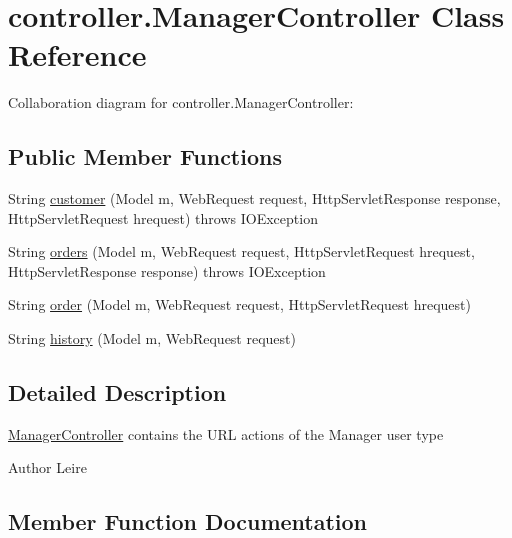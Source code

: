 \hypertarget{classcontroller_1_1_manager_controller}{}\section{controller.\+Manager\+Controller Class Reference}
\label{classcontroller_1_1_manager_controller}


Collaboration diagram for controller.\+Manager\+Controller\+:
\subsection*{Public Member Functions}
\begin{DoxyCompactItemize}
\item 
String \mbox{\hyperlink{classcontroller_1_1_manager_controller_aa49d493a4fb9aa5f0e99f942b21d3991}{customer}} (Model m, Web\+Request request, Http\+Servlet\+Response response, Http\+Servlet\+Request hrequest)  throws I\+O\+Exception 
\item 
String \mbox{\hyperlink{classcontroller_1_1_manager_controller_a59689dd37c44b3294edc931668e57fb0}{orders}} (Model m, Web\+Request request, Http\+Servlet\+Request hrequest, Http\+Servlet\+Response response)  throws I\+O\+Exception 
\item 
String \mbox{\hyperlink{classcontroller_1_1_manager_controller_a32dde55b16d1fb8e38f0a4f1cc0351be}{order}} (Model m, Web\+Request request, Http\+Servlet\+Request hrequest)
\item 
String \mbox{\hyperlink{classcontroller_1_1_manager_controller_a06fcd2a1ad144e711de97430841a804f}{history}} (Model m, Web\+Request request)
\end{DoxyCompactItemize}


\subsection{Detailed Description}
\mbox{\hyperlink{classcontroller_1_1_manager_controller}{Manager\+Controller}} contains the U\+RL actions of the Manager user type \begin{DoxyAuthor}{Author}
Leire 
\end{DoxyAuthor}


\subsection{Member Function Documentation}
\mbox{\label{classcontroller_1_1_manager_controller_aa49d493a4fb9aa5f0e99f942b21d3991}} 
